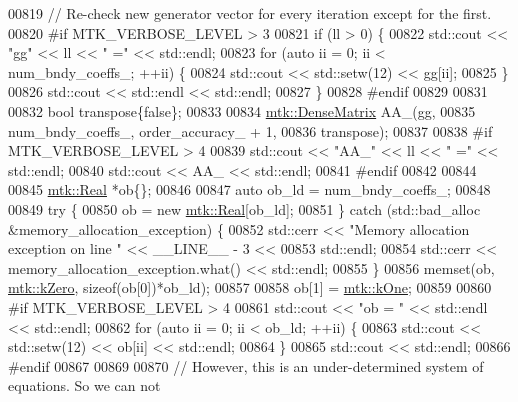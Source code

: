 \begin{DoxyCode}
{{00819     \textcolor{comment}{// Re-check new generator vector for every iteration except for the first.}
00820 \textcolor{preprocessor}{    #if MTK\_VERBOSE\_LEVEL > 3}
00821     \textcolor{keywordflow}{if} (ll > 0) \{
00822       std::cout << \textcolor{stringliteral}{"gg"} << ll << \textcolor{stringliteral}{" ="} << std::endl;
00823       \textcolor{keywordflow}{for} (\textcolor{keyword}{auto} ii = 0; ii < num\_bndy\_coeffs\_; ++ii) \{
00824         std::cout << std::setw(12) << gg[ii];
00825       \}
00826       std::cout << std::endl << std::endl;
00827     \}
00828 \textcolor{preprocessor}{    #endif}
00829 
00831 
00832     \textcolor{keywordtype}{bool} transpose\{\textcolor{keyword}{false}\};
00833 
00834     \hyperlink{classmtk_1_1DenseMatrix}{mtk::DenseMatrix} AA\_(gg,
00835                          num\_bndy\_coeffs\_, order\_accuracy\_ + 1,
00836                          transpose);
00837 
00838 \textcolor{preprocessor}{    #if MTK\_VERBOSE\_LEVEL > 4}
00839     std::cout << \textcolor{stringliteral}{"AA\_"} << ll << \textcolor{stringliteral}{" ="} << std::endl;
00840     std::cout << AA\_ << std::endl;
00841 \textcolor{preprocessor}{    #endif}
00842 
00844 
00845     \hyperlink{group__c01-roots_gac080bbbf5cbb5502c9f00405f894857d}{mtk::Real} *ob\{\};
00846 
00847     \textcolor{keyword}{auto} ob\_ld = num\_bndy\_coeffs\_;
00848 
00849     \textcolor{keywordflow}{try} \{
00850       ob = \textcolor{keyword}{new} \hyperlink{group__c01-roots_gac080bbbf5cbb5502c9f00405f894857d}{mtk::Real}[ob\_ld];
00851     \} \textcolor{keywordflow}{catch} (std::bad\_alloc &memory\_allocation\_exception) \{
00852       std::cerr << \textcolor{stringliteral}{"Memory allocation exception on line "} << \_\_LINE\_\_ - 3 <<
00853         std::endl;
00854       std::cerr << memory\_allocation\_exception.what() << std::endl;
00855     \}
00856     memset(ob, \hyperlink{group__c01-roots_ga59a451a5fae30d59649bcda274fea271}{mtk::kZero}, \textcolor{keyword}{sizeof}(ob[0])*ob\_ld);
00857 
00858     ob[1] = \hyperlink{group__c01-roots_ga26407c24d43b6b95480943340d285c71}{mtk::kOne};
00859 
00860 \textcolor{preprocessor}{    #if MTK\_VERBOSE\_LEVEL > 4}
00861     std::cout << \textcolor{stringliteral}{"ob = "} << std::endl << std::endl;
00862     \textcolor{keywordflow}{for} (\textcolor{keyword}{auto} ii = 0; ii < ob\_ld; ++ii) \{
00863       std::cout << std::setw(12) << ob[ii] << std::endl;
00864     \}
00865     std::cout << std::endl;
00866 \textcolor{preprocessor}{    #endif}
00867 
00869 
00870     \textcolor{comment}{// However, this is an under-determined system of equations. So we can not}
}}
\end{DoxyCode}
